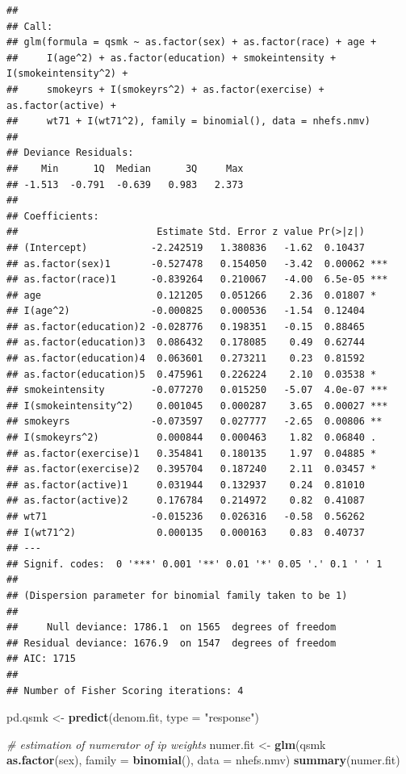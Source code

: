 \documentclass[
  10pt,
]{book}
\newenvironment{Shaded}{\begin{snugshade}}{\end{snugshade}}
\newcommand{\CommentTok}[1]{\textcolor[rgb]{0.56,0.35,0.01}{\textit{#1}}}
\newcommand{\DataTypeTok}[1]{\textcolor[rgb]{0.13,0.29,0.53}{#1}}
\newcommand{\KeywordTok}[1]{\textcolor[rgb]{0.13,0.29,0.53}{\textbf{#1}}}
\newcommand{\NormalTok}[1]{#1}
\newcommand{\OperatorTok}[1]{\textcolor[rgb]{0.81,0.36,0.00}{\textbf{#1}}}
\newcommand{\StringTok}[1]{\textcolor[rgb]{0.31,0.60,0.02}{#1}}
\begin{document}
\begin{verbatim}
## 
## Call:
## glm(formula = qsmk ~ as.factor(sex) + as.factor(race) + age + 
##     I(age^2) + as.factor(education) + smokeintensity + I(smokeintensity^2) + 
##     smokeyrs + I(smokeyrs^2) + as.factor(exercise) + as.factor(active) + 
##     wt71 + I(wt71^2), family = binomial(), data = nhefs.nmv)
## 
## Deviance Residuals: 
##    Min      1Q  Median      3Q     Max  
## -1.513  -0.791  -0.639   0.983   2.373  
## 
## Coefficients:
##                        Estimate Std. Error z value Pr(>|z|)    
## (Intercept)           -2.242519   1.380836   -1.62  0.10437    
## as.factor(sex)1       -0.527478   0.154050   -3.42  0.00062 ***
## as.factor(race)1      -0.839264   0.210067   -4.00  6.5e-05 ***
## age                    0.121205   0.051266    2.36  0.01807 *  
## I(age^2)              -0.000825   0.000536   -1.54  0.12404    
## as.factor(education)2 -0.028776   0.198351   -0.15  0.88465    
## as.factor(education)3  0.086432   0.178085    0.49  0.62744    
## as.factor(education)4  0.063601   0.273211    0.23  0.81592    
## as.factor(education)5  0.475961   0.226224    2.10  0.03538 *  
## smokeintensity        -0.077270   0.015250   -5.07  4.0e-07 ***
## I(smokeintensity^2)    0.001045   0.000287    3.65  0.00027 ***
## smokeyrs              -0.073597   0.027777   -2.65  0.00806 ** 
## I(smokeyrs^2)          0.000844   0.000463    1.82  0.06840 .  
## as.factor(exercise)1   0.354841   0.180135    1.97  0.04885 *  
## as.factor(exercise)2   0.395704   0.187240    2.11  0.03457 *  
## as.factor(active)1     0.031944   0.132937    0.24  0.81010    
## as.factor(active)2     0.176784   0.214972    0.82  0.41087    
## wt71                  -0.015236   0.026316   -0.58  0.56262    
## I(wt71^2)              0.000135   0.000163    0.83  0.40737    
## ---
## Signif. codes:  0 '***' 0.001 '**' 0.01 '*' 0.05 '.' 0.1 ' ' 1
## 
## (Dispersion parameter for binomial family taken to be 1)
## 
##     Null deviance: 1786.1  on 1565  degrees of freedom
## Residual deviance: 1676.9  on 1547  degrees of freedom
## AIC: 1715
## 
## Number of Fisher Scoring iterations: 4
\end{verbatim}

\begin{Shaded}
\begin{Highlighting}[]
\NormalTok{pd.qsmk <-}\StringTok{ }\KeywordTok{predict}\NormalTok{(denom.fit, }\DataTypeTok{type =} \StringTok{"response"}\NormalTok{)}

\CommentTok{# estimation of numerator of ip weights}
\NormalTok{numer.fit <-}
\StringTok{  }\KeywordTok{glm}\NormalTok{(qsmk }\OperatorTok{~}\StringTok{ }\KeywordTok{as.factor}\NormalTok{(sex), }\DataTypeTok{family =} \KeywordTok{binomial}\NormalTok{(), }\DataTypeTok{data =}\NormalTok{ nhefs.nmv)}
\KeywordTok{summary}\NormalTok{(numer.fit)}
\end{Highlighting}
\end{Shaded}
\end{document}
